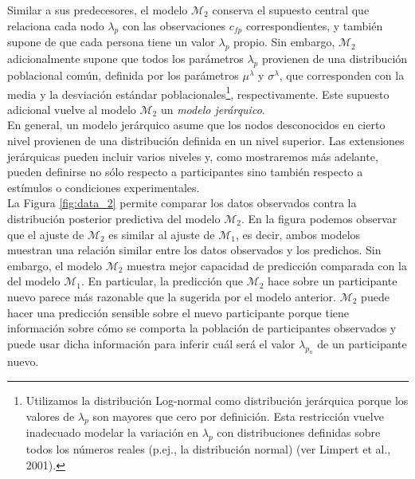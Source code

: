 \documentclass{article}
\begin{document}
\indent Similar a sus predecesores, el modelo $\mathcal M_2$ conserva el supuesto central que relaciona cada nodo $\lambda_p$ con las observaciones $c_{fp}$ correspondientes, y también supone de que cada persona tiene un valor $\lambda_p$ propio. Sin embargo, $\mathcal M_2$ adicionalmente supone que todos los parámetros $\lambda_p$ provienen de una distribución poblacional común, definida por los parámetros $\mu^\lambda$ y $\sigma^\lambda$, que corresponden con la media y la desviación estándar poblacionales\footnote{Utilizamos la distribución Log-normal como distribución jerárquica porque los valores de $\lambda_p$ son mayores que cero por definición. Esta restricción vuelve inadecuado modelar la variación en $\lambda_p$ con distribuciones definidas sobre todos los números reales (p.ej., la distribución normal) (ver Limpert et al., 2001).}, respectivamente. Este supuesto adicional vuelve al modelo $\mathcal M_2$ un \emph{modelo jerárquico}.\\
\indent En general, un modelo jerárquico asume que los nodos desconocidos en cierto nivel provienen de una distribución definida en un nivel superior. Las extensiones jerárquicas pueden incluir varios niveles y, como mostraremos más adelante, pueden definirse no sólo respecto a participantes sino también respecto a estímulos o condiciones experimentales.\\
\indent La Figura \ref{fig:data_2} permite comparar los datos observados contra la distribución posterior predictiva del modelo $\mathcal M_2$. En la figura podemos observar que el ajuste de $\mathcal M_2$ es similar al ajuste de $\mathcal M_1$, es decir, ambos modelos muestran una relación similar entre los datos observados y los predichos. Sin embargo, el modelo $\mathcal M_2$ muestra mejor capacidad de predicción comparada con la del modelo $\mathcal M_1$. En particular, la predicción que $\mathcal M_2$ hace sobre un participante nuevo parece más razonable que la sugerida por el modelo anterior. $\mathcal M_2$ puede hacer una predicción sensible sobre el nuevo participante porque tiene información sobre cómo se comporta la población de participantes observados y puede usar dicha información para inferir cuál será el valor $\lambda_{p_{n}}$ de un participante nuevo.
\end{document}
